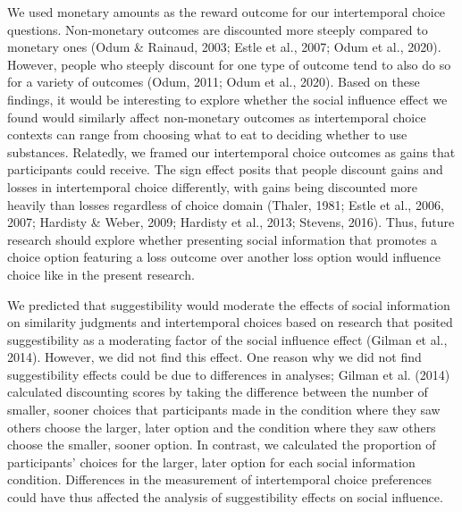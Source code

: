 \documentclass[
  pub,floatsintext]{apa6}
\begin{document}
We used monetary amounts as the reward outcome for our intertemporal choice questions. Non-monetary outcomes are discounted more steeply compared to monetary ones (Odum \& Rainaud, 2003; Estle et al., 2007; Odum et al., 2020). However, people who steeply discount for one type of outcome tend to also do so for a variety of outcomes (Odum, 2011; Odum et al., 2020). Based on these findings, it would be interesting to explore whether the social influence effect we found would similarly affect non-monetary outcomes as intertemporal choice contexts can range from choosing what to eat to deciding whether to use substances. Relatedly, we framed our intertemporal choice outcomes as gains that participants could receive. The sign effect posits that people discount gains and losses in intertemporal choice differently, with gains being discounted more heavily than losses regardless of choice domain (Thaler, 1981; Estle et al., 2006, 2007; Hardisty \& Weber, 2009; Hardisty et al., 2013; Stevens, 2016). Thus, future research should explore whether presenting social information that promotes a choice option featuring a loss outcome over another loss option would influence choice like in the present research.

We predicted that suggestibility would moderate the effects of social information on similarity judgments and intertemporal choices based on research that posited suggestibility as a moderating factor of the social influence effect (Gilman et al., 2014). However, we did not find this effect. One reason why we did not find suggestibility effects could be due to differences in analyses; Gilman et al. (2014) calculated discounting scores by taking the difference between the number of smaller, sooner choices that participants made in the condition where they saw others choose the larger, later option and the condition where they saw others choose the smaller, sooner option. In contrast, we calculated the proportion of participants' choices for the larger, later option for each social information condition. Differences in the measurement of intertemporal choice preferences could have thus affected the analysis of suggestibility effects on social influence.
\end{document}

